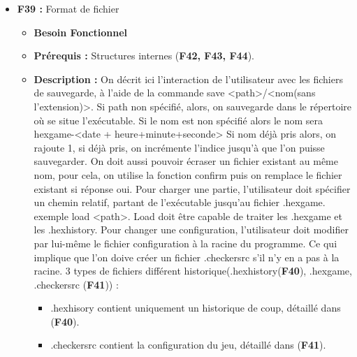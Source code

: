 \documentclass{article}
\begin{document}
\begin{itemize}
\begin{itemize}
\begin{itemize}
\begin{itemize}
            \end{itemize}
        \end{itemize}
    \end{itemize}
\bigskip
    \item \textbf{F39 :} Format de fichier
    \begin{itemize}
        \item \textbf{Besoin Fonctionnel}
        \item \textbf{Prérequis :} Structures internes (\textbf{F42, F43, F44}).
        \item \textbf{Description :}  On décrit ici l'interaction de l'utilisateur avec les fichiers de sauvegarde, à l’aide de la commande save <path>/<nom(sans l’extension)>. Si path non spécifié, alors, on sauvegarde dans le répertoire où se situe l'exécutable. Si le nom est non spécifié alors le nom sera hexgame-<date + heure+minute+seconde> Si nom déjà pris alors, on rajoute 1, si déjà pris, on incrémente l’indice jusqu'à que l’on puisse sauvegarder. On doit aussi pouvoir écraser un fichier existant au même nom, pour cela, on utilise la fonction confirm puis on remplace le fichier existant si réponse oui. Pour charger une partie, l'utilisateur doit spécifier un chemin relatif, partant de l'exécutable jusqu’au fichier .hexgame. exemple load <path>. Load doit être capable de traiter les .hexgame et les .hexhistory. Pour changer une configuration, l'utilisateur doit modifier par lui-même le fichier configuration à la racine du programme. Ce qui implique que l’on doive créer un fichier .checkersrc s'il n’y en a pas à la racine. 3 types de fichiers différent historique(.hexhistory(\textbf{F40}), .hexgame, .checkersrc (\textbf{F41})) :
        \begin{itemize}
            \item .hexhisory contient uniquement un historique de coup, détaillé dans (\textbf{F40}).
            \item .checkersrc contient la configuration du jeu, détaillé dans (\textbf{F41}).

\end{itemize}
\end{itemize}
\end{itemize}
\end{document}
